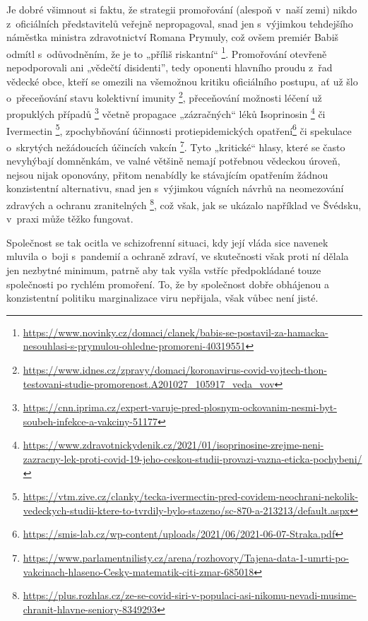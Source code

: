Je dobré všimnout si faktu, že strategii promořování (alespoň v~naší zemi) nikdo z~oficiálních představitelů veřejně nepropagoval, snad jen s~výjimkou tehdejšího náměstka ministra zdravotnictví Romana Prymuly, což ovšem premiér Babiš odmítl s~odůvodněním, že je to „příliš riskantní“ \footnote{\url{https://www.novinky.cz/domaci/clanek/babis-se-postavil-za-hamacka-nesouhlasi-s-prymulou-ohledne-promoreni-40319551}}. Promořování otevřeně nepodporovali ani „vědečtí disidenti”, tedy oponenti hlavního proudu z~řad vědecké obce, kteří se omezili na všemožnou kritiku oficiálního postupu, ať už šlo o~přeceňování stavu kolektivní imunity \footnote{\url{https://www.idnes.cz/zpravy/domaci/koronavirus-covid-vojtech-thon-testovani-studie-promorenost.A201027_105917_veda_vov}}, přeceňování možnosti léčení už propuklých případů \footnote{\url{https://cnn.iprima.cz/expert-varuje-pred-plosnym-ockovanim-nesmi-byt-soubeh-infekce-a-vakciny-51177}} včetně propagace „zázračných“ léků Isoprinosin \footnote{\url{https://www.zdravotnickydenik.cz/2021/01/isoprinosine-zrejme-neni-zazracny-lek-proti-covid-19-jeho-ceskou-studii-provazi-vazna-eticka-pochybeni/}} či Ivermectin \footnote{\url{https://vtm.zive.cz/clanky/tecka-ivermectin-pred-covidem-neochrani-nekolik-vedeckych-studii-ktere-to-tvrdily-bylo-stazeno/sc-870-a-213213/default.aspx}}, zpochybňování účinnosti protiepidemických opatření\footnote{\url{https://smis-lab.cz/wp-content/uploads/2021/06/2021-06-07-Straka.pdf}} či spekulace o~skrytých nežádoucích účincích vakcín \footnote{\url{https://www.parlamentnilisty.cz/arena/rozhovory/Tajena-data-1-umrti-po-vakcinach-hlaseno-Cesky-matematik-citi-zmar-685018}}. Tyto „kritické“ hlasy, které se často nevyhýbají domněnkám, ve valné většině nemají potřebnou vědeckou úroveň, nejsou nijak oponovány, přitom nenabídly ke stávajícím opatřením žádnou konzistentní alternativu, snad jen s~výjimkou vágních návrhů na neomezování zdravých a ochranu zranitelných \footnote{\url{https://plus.rozhlas.cz/ze-se-covid-siri-v-populaci-asi-nikomu-nevadi-musime-chranit-hlavne-seniory-8349293}}, což však, jak se ukázalo například ve Švédsku, v~praxi může těžko fungovat. 

Společnost se tak ocitla ve schizofrenní situaci, kdy její vláda sice navenek mluvila o~boji s~pandemií a ochraně zdraví, ve skutečnosti však proti ní dělala jen nezbytné minimum, patrně aby tak vyšla vstříc předpokládané touze společnosti po rychlém promoření. To, že by společnost dobře obhájenou a konzistentní politiku marginalizace viru nepřijala, však vůbec není jisté.

